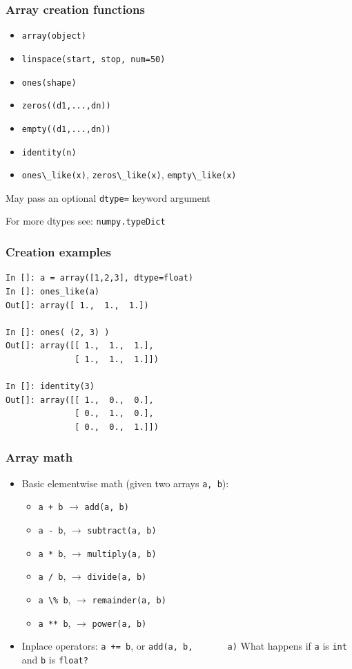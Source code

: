 \documentclass[14pt,compress]{beamer}
\newcounter{time}
\newcommand{\inctime}[1]{\addtocounter{time}{#1}{\tiny \thetime\ m}}
\newcommand{\typ}[1]{\lstinline{#1}}
\begin{document}
\begin{frame}[fragile]
  \frametitle{Array creation functions}
  \begin{itemize}
  \item \typ{array(object)}
  \item \typ{linspace(start, stop, num=50)}
  \item \typ{ones(shape)}
  \item \typ{zeros((d1,...,dn))}
  \item \typ{empty((d1,...,dn))}
  \item \typ{identity(n)}
  \item \typ{ones\_like(x)}, \typ{zeros\_like(x)}, \typ{empty\_like(x)}
  \end{itemize}
  May pass an optional \typ{dtype=} keyword argument

  For more dtypes see: \typ{numpy.typeDict}

\end{frame}

\begin{frame}[fragile]
  \frametitle{Creation examples}
  \vspace*{-0.25in}
\begin{lstlisting}
In []: a = array([1,2,3], dtype=float)
In []: ones_like(a)
Out[]: array([ 1.,  1.,  1.])

In []: ones( (2, 3) )
Out[]: array([[ 1.,  1.,  1.],
              [ 1.,  1.,  1.]])

In []: identity(3)
Out[]: array([[ 1.,  0.,  0.],
              [ 0.,  1.,  0.],
              [ 0.,  0.,  1.]])
\end{lstlisting}
  \inctime{15}
\end{frame}

\begin{frame}[fragile]
  \frametitle{Array math}
  \begin{itemize}
  \item Basic \alert{elementwise} math (given two arrays \typ{a, b}):
    \begin{itemize}
        \item \typ{a + b} $\rightarrow$ \typ{add(a, b)}
        \item \typ{a - b}, $\rightarrow$ \typ{subtract(a, b)}
        \item \typ{a * b}, $\rightarrow$ \typ{multiply(a, b)}
        \item \typ{a / b}, $\rightarrow$ \typ{divide(a, b)}
        \item \typ{a \% b}, $\rightarrow$ \typ{remainder(a, b)}
        \item \typ{a ** b}, $\rightarrow$ \typ{power(a, b)}
    \end{itemize}
  \item Inplace operators: \typ{a += b}, or \typ{add(a, b,
      a)}
    \alert{What happens if \typ{a} is \typ{int} and \typ{b} is \typ{float?}}
  \end{itemize}
\end{frame}
\end{document}
